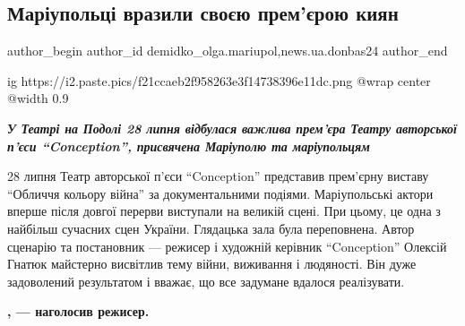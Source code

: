  
 
 
 
 
 
\subsection{Маріупольці вразили своєю прем'єрою киян}
\label{sec:29_07_2022.stz.news.ua.donbas24.1.mariupolci_vrazyly_kyjan}
 
\ifcmt
 author_begin
   author_id demidko_olga.mariupol,news.ua.donbas24
 author_end
\fi

\ifcmt
  ig https://i2.paste.pics/f21ccaeb2f958263e3f14738396e11dc.png
  @wrap center
  @width 0.9
\fi

\begin{center}
\em\color{blue}\bfseries\Large
У Театрі на Подолі 28 липня відбулася важлива прем'єра Театру авторської п'єси
\enquote{Conception}, присвячена Маріуполю та маріупольцям
\end{center}

28 липня Театр авторської п'єси \enquote{Conception} представив прем'єрну виставу
\enquote{Обличчя кольору війна} за документальними подіями. Маріупольські актори вперше
після довгої перерви виступали на великій сцені. При цьому, це одна з найбільш
сучасних сцен України. Глядацька зала була переповнена. Автор сценарію та
постановник — режисер і художній керівник \enquote{Conception} Олексій Гнатюк майстерно
висвітлив тему війни, виживання і людяності. Він дуже задоволений результатом і
вважає, що все задумане вдалося реалізувати. 

\begin{leftbar}
	\begingroup
		\bfseries
{}, — наголосив
режисер. 
	\endgroup
\end{leftbar}


